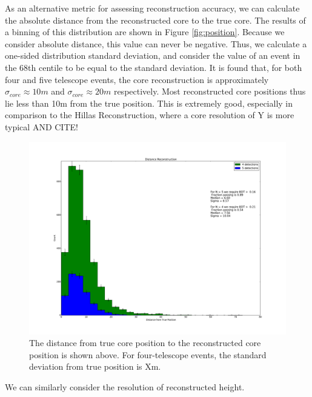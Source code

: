 \documentclass[11pt]{article}
\begin{document}
As an alternative metric for assessing reconstruction accuracy, we can calculate the absolute distance from the reconstructed core to the true core. The results of a binning of this distribution are shown in Figure \ref{fig:position}. Because we consider absolute distance, this value can never be negative. Thus, we calculate a one-sided distribution standard deviation, and consider the value of an event in the 68th centile to be equal to the standard deviation. It is found that, for both four and five telescope events, the core reconstruction is approximately $\sigma_{core} \approx 10m$ and $\sigma_{core} \approx 20m$ respectively. Most reconstructed core positions thus lie less than 10m from the true position. This is extremely good, especially in comparison to the Hillas Reconstruction, where a core resolution of Y is more typical AND CITE!

\begin{figure}
\begin{center}
\includegraphics[width=\textwidth]{position}
\caption{The distance from true core position to the reconstructed core position is shown above. For four-telescope events, the standard deviation from true position is Xm.}
\label{fig:rawposition}
\end{center}
\end{figure}

We can similarly consider the resolution of reconstructed height.
\end{document}
